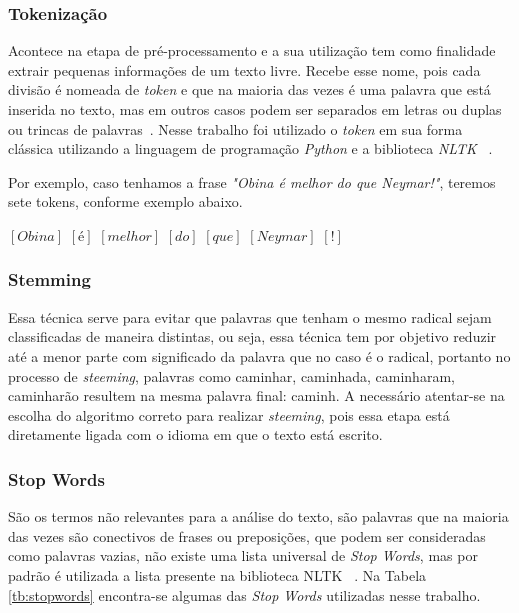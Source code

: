         \subsubsection{Tokenização}

              Acontece na etapa de pré-processamento e a sua utilização tem como finalidade extrair pequenas informações de um texto livre. Recebe esse nome, 
            pois cada divisão é nomeada de \textit{token} e que na maioria das vezes é uma palavra que está inserida no texto, mas em outros casos podem 
            ser separados em letras ou duplas ou trincas de palavras~\cite{mcnamee2004character}. Nesse trabalho foi utilizado o \textit{token} em sua forma clássica utilizando 
            a linguagem de programação \textit{Python} e a biblioteca \textit{NLTK} ~\cite{bird2004nltk}.

              Por exemplo, caso tenhamos a frase \textit{"Obina é melhor do que Neymar!"}, teremos sete tokens, conforme exemplo abaixo.

                    $[Obina]$  $[é]$  $[melhor]$  $[do]$  $[que]$  $[Neymar]$  $[!]$
        \subsubsection{Stemming}

            Essa técnica serve para evitar que palavras que tenham o mesmo radical sejam classificadas de maneira distintas, ou seja, essa técnica tem
            por objetivo reduzir até a menor parte com significado da palavra que no caso é o radical, portanto no processo de \textit{steeming}, palavras
            como caminhar, caminhada, caminharam, caminharão resultem na mesma palavra final: caminh. A necessário atentar-se na escolha do algoritmo correto 
            para realizar \textit{steeming}, pois essa etapa está diretamente ligada com o idioma em que o texto está escrito.
        \subsubsection{Stop Words}

          São os termos não relevantes para a análise do texto, são palavras que na maioria das vezes são conectivos de frases ou preposições, que podem
          ser consideradas como palavras vazias, não existe uma lista universal de \textit{Stop Words}, mas por padrão é utilizada a lista presente na biblioteca
          NLTK ~\cite{bird2004nltk}. Na Tabela \ref{tb:stopwords} encontra-se algumas das \textit{Stop Words} utilizadas nesse trabalho.

